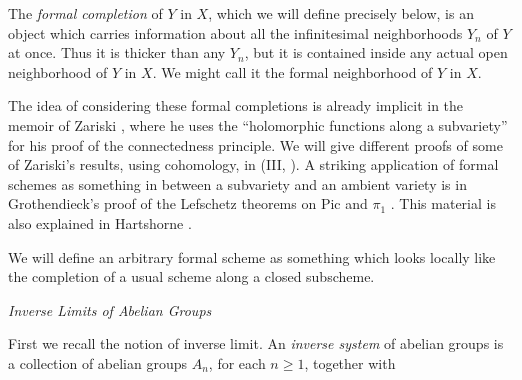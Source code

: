 {The \emph{formal completion} of $Y$ in $X$, which we will define precisely below, is an object which carries information about all the infinitesimal neighborhoods $Y_n$ of $Y$ at once. Thus it is thicker than any $Y_n$, but it is contained inside any actual open neighborhood of $Y$ in $X$. We might call it the formal neighborhood of $Y$ in $X$.

The idea of considering these formal completions is already implicit in the memoir of Zariski , where he uses the \textquotedblleft{}holomorphic functions along a subvariety\textquotedblright{} for his proof of the connectedness principle. We will give different proofs of some of Zariski's results, using cohomology, in (III, ). A striking application of formal schemes as something in between a subvariety and an ambient variety is in Grothendieck's proof of the Lefschetz theorems on Pic and $\pi_1$ . This material is also explained in Hartshorne .

We will define an arbitrary formal scheme as something which looks locally like the completion of a usual scheme along a closed subscheme.

\medskip
\noindent\emph{Inverse Limits of Abelian Groups}\par
\smallskip
\noindent First we recall the notion of inverse limit. An \emph{inverse system} of abelian groups is a collection of abelian groups $A_n$, for each $n\ge1$, together with}
